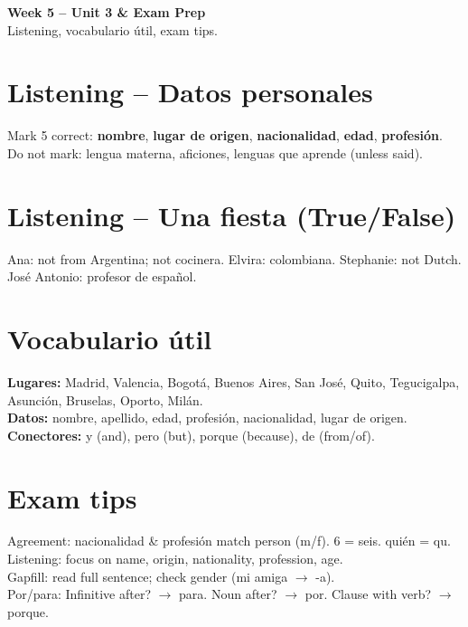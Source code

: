 \documentclass[10pt,a4paper]{article}
\begin{document}
\begin{center}
{\large\bfseries\color{w5navy} Week 5 -- Unit 3 \& Exam Prep}\\[0.2em]
\footnotesize Listening, vocabulario \'util, exam tips.
\end{center}\vspace{0.5em}

\section*{\color{w5navy}Listening -- Datos personales}
Mark 5 correct: \textbf{nombre}, \textbf{lugar de origen}, \textbf{nacionalidad}, \textbf{edad}, \textbf{profesi\'on}. \\
Do not mark: lengua materna, aficiones, lenguas que aprende (unless said).

\section*{\color{w5navy}Listening -- Una fiesta (True/False)}
Ana: not from Argentina; not cocinera. Elvira: colombiana. Stephanie: not Dutch. Jos\'e Antonio: profesor de espa\~nol.

\section*{\color{w5navy}Vocabulario \'util}
\textbf{Lugares:} Madrid, Valencia, Bogot\'a, Buenos Aires, San Jos\'e, Quito, Tegucigalpa, Asunci\'on, Bruselas, Oporto, Mil\'an. \\
\textbf{Datos:} nombre, apellido, edad, profesi\'on, nacionalidad, lugar de origen. \\
\textbf{Conectores:} y (and), pero (but), porque (because), de (from/of).

\section*{\color{w5navy}Exam tips}
Agreement: nacionalidad \& profesi\'on match person (m/f). 6 = seis. qui\'en = qu. \\
Listening: focus on name, origin, nationality, profession, age. \\
Gapfill: read full sentence; check gender (mi amiga $\to$ -a). \\
Por/para: Infinitive after? $\to$ para. Noun after? $\to$ por. Clause with verb? $\to$ porque.
\end{document}
